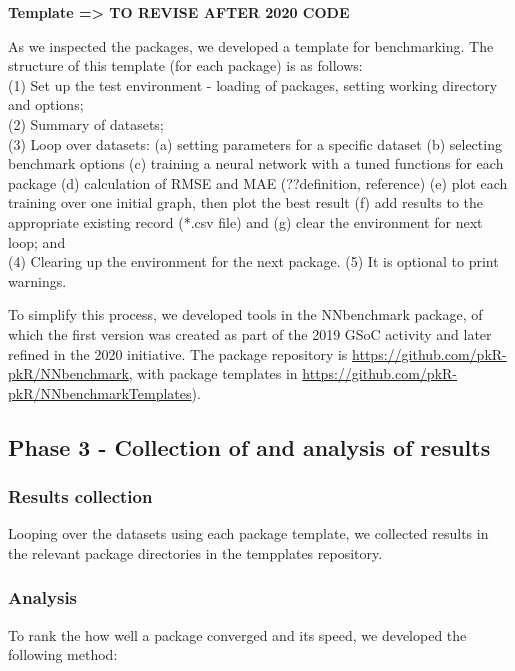 \textbf{Template =\textgreater{} TO REVISE AFTER 2020 CODE}

As we inspected the packages, we developed a template for benchmarking.
The structure of this template (for each package) is as follows:\\
(1) Set up the test environment - loading of packages, setting working
directory and options;\\
(2) Summary of datasets;\\
(3) Loop over datasets: (a) setting parameters for a specific dataset
(b) selecting benchmark options (c) training a neural network with a
tuned functions for each package (d) calculation of RMSE and MAE
(??definition, reference) (e) plot each training over one initial graph,
then plot the best result (f) add results to the appropriate existing
record (*.csv file) and (g) clear the environment for next loop; and\\
(4) Clearing up the environment for the next package. (5) It is optional
to print warnings.

To simplify this process, we developed tools in the NNbenchmark package,
of which the first version was created as part of the 2019 GSoC activity
and later refined in the 2020 initiative. The package repository is
\url{https://github.com/pkR-pkR/NNbenchmark}, with package templates in
\url{https://github.com/pkR-pkR/NNbenchmarkTemplates}).

\hypertarget{phase-3---collection-of-and-analysis-of-results}{%
\subsection{Phase 3 - Collection of and analysis of
results}\label{phase-3---collection-of-and-analysis-of-results}}

\hypertarget{results-collection}{%
\subsubsection{Results collection}\label{results-collection}}

Looping over the datasets using each package template, we collected
results in the relevant package directories in the tempplates
repository.

\hypertarget{analysis}{%
\subsubsection{Analysis}\label{analysis}}

To rank the how well a package converged and its speed, we developed the
following method:

